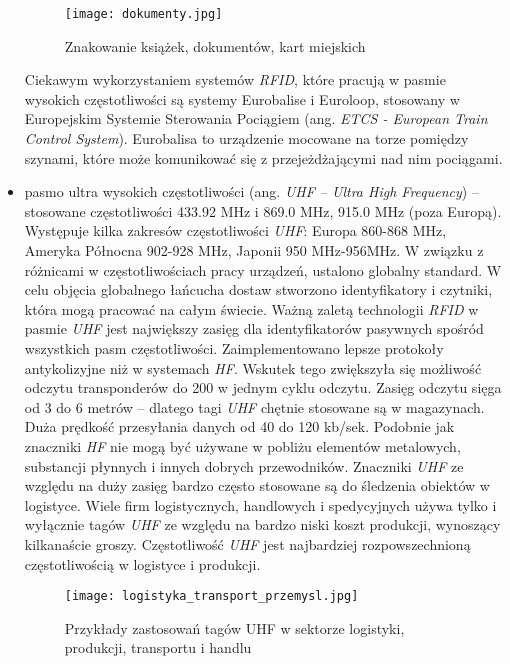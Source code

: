 \begin{itemize}
	\begin{figure}[h!]
	\centering
	    \texttt{[image: dokumenty.jpg]}
	    \caption{Znakowanie książek, dokumentów, kart miejskich}
	\end{figure}
	
	Ciekawym wykorzystaniem systemów \emph{RFID}, które pracują w pasmie wysokich częstotliwości są systemy Eurobalise i Euroloop, stosowany w Europejskim Systemie Sterowania Pociągiem (ang. \emph{ETCS - European Train Control System}). Eurobalisa to urządzenie mocowane na torze pomiędzy szynami, które może komunikować się z przejeżdżającymi nad nim pociągami.


	\item pasmo ultra wysokich częstotliwości (ang. \emph{UHF – Ultra High Frequency}) – stosowane częstotliwości 433.92 MHz i 869.0 MHz, 915.0 MHz (poza Europą).
Występuje kilka zakresów częstotliwości \emph{UHF}: Europa 860-868 MHz, Ameryka Północna 902-928 MHz, Japonii  950 MHz-956MHz. W związku z różnicami w częstotliwościach pracy urządzeń, ustalono globalny standard.  W celu objęcia globalnego łańcucha dostaw stworzono identyfikatory i czytniki, która mogą pracować na całym świecie. Ważną zaletą technologii \emph{RFID} w pasmie \emph{UHF} jest największy zasięg dla identyfikatorów pasywnych spośród wszystkich pasm częstotliwości. Zaimplementowano lepsze protokoły antykolizyjne niż w systemach \emph{HF}. Wskutek tego zwiększyła się możliwość odczytu transponderów do 200 w jednym cyklu odczytu.  Zasięg odczytu sięga od 3 do 6 metrów – dlatego tagi \emph{UHF} chętnie stosowane są w magazynach.  Duża prędkość przesyłania danych od 40 do 120 kb/sek.  
Podobnie jak znaczniki \emph{HF} nie mogą być używane w pobliżu elementów metalowych, substancji płynnych i innych dobrych przewodników. 
Znaczniki \emph{UHF} ze względu na duży zasięg bardzo często stosowane są do śledzenia obiektów w logistyce. Wiele firm logistycznych, handlowych i spedycyjnych używa tylko i wyłącznie tagów \emph{UHF} ze względu na bardzo niski koszt produkcji, wynoszący kilkanaście groszy. 
Częstotliwość \emph{UHF} jest najbardziej rozpowszechnioną częstotliwością w logistyce i produkcji.

	\begin{figure}[h!]
	\centering
	    \texttt{[image: logistyka\_transport\_przemysl.jpg]}
	    \caption{Przykłady zastosowań tagów UHF w sektorze logistyki, produkcji, transportu i handlu}
	\end{figure}


\end{itemize}
